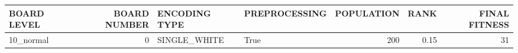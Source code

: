 \begin{tabular}{lrllrrr}
\hline
 BOARD LEVEL   &   BOARD NUMBER & ENCODING TYPE   & PREPROCESSING   &   POPULATION &   RANK &   FINAL FITNESS \\
\hline
 10\_normal     &              0 & SINGLE\_WHITE    & True            &          200 &   0.15 &              31 \\
\hline
\end{tabular}